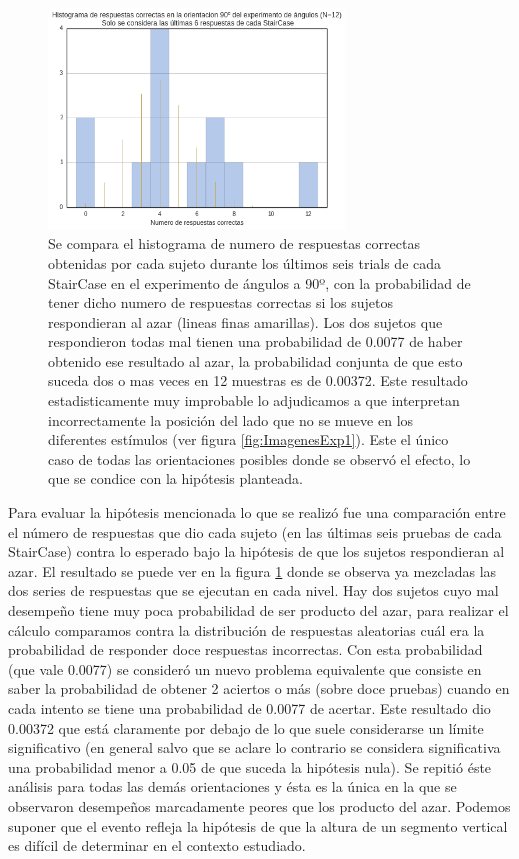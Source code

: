 \documentclass{article}
\numberwithin{figure}{section}
\begin{document}
    \begin{figure}
        \center
        \includegraphics[width=0.7\textwidth]{Imagenes/Exp1_Saturacion.png}
        \caption{Se compara el histograma de numero de respuestas correctas obtenidas por cada sujeto durante los últimos seis trials de cada StairCase en el experimento de ángulos a 90º, con la probabilidad de tener dicho numero de respuestas correctas si los sujetos respondieran al azar (lineas finas amarillas). Los dos sujetos que respondieron todas mal tienen una probabilidad de 0.0077 de haber obtenido ese resultado al azar, la probabilidad conjunta de que esto suceda dos o mas veces en 12 muestras es de 0.00372. Este resultado estadisticamente muy improbable lo adjudicamos a que interpretan incorrectamente la posición del lado que no se mueve en los diferentes estímulos (ver figura \ref{fig:ImagenesExp1}). Este el único caso de todas las orientaciones posibles donde se observó el efecto, lo que se condice con la hipótesis planteada.}
        \label{fig:Exp1Saturacion}
    \end{figure}  
    
    Para evaluar la hipótesis mencionada lo que se realizó fue una comparación entre el número de respuestas que dio cada sujeto (en las últimas seis pruebas de cada StairCase) contra lo esperado bajo la hipótesis de que los sujetos respondieran al azar. El resultado se puede ver en la figura \ref{fig:Exp1Saturacion} donde se observa ya mezcladas las dos series de respuestas que se ejecutan en cada nivel. Hay dos sujetos cuyo mal desempeño tiene muy poca probabilidad de ser producto del azar, para realizar el cálculo comparamos contra la distribución de respuestas aleatorias cuál era la probabilidad de responder doce respuestas incorrectas. Con esta probabilidad (que vale 0.0077) se consideró un nuevo problema equivalente que consiste en saber la probabilidad de obtener 2 aciertos o más (sobre doce pruebas) cuando en cada intento se tiene una probabilidad de 0.0077 de acertar. Este resultado dio 0.00372 que está claramente por debajo de lo que suele considerarse un límite significativo (en general salvo que se aclare lo contrario se considera significativa una probabilidad menor a 0.05 de que suceda la hipótesis nula). Se repitió éste análisis para todas las demás orientaciones y ésta es la única en la que se observaron desempeños marcadamente peores que los producto del azar. Podemos suponer que el evento refleja la hipótesis de que la altura de un segmento vertical es difícil de determinar en el contexto estudiado.
    
\end{document}
